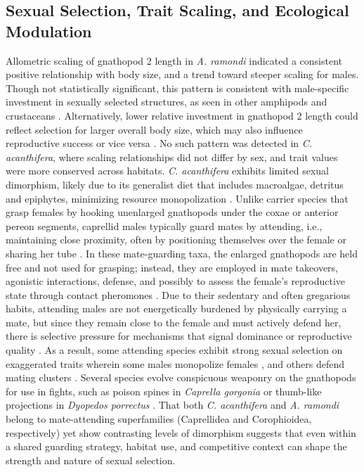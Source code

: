 \documentclass[journal,article,submit,pdftex,moreauthors]{Definitions/mdpi}
\begin{document}
    		\subsection{Sexual Selection, Trait Scaling, and Ecological Modulation}
    		
    		Allometric scaling of gnathopod 2 length in \textit{A. ramondi} indicated a consistent positive relationship with body size, and a trend toward steeper scaling for males. Though not statistically significant, this pattern is consistent with male-specific investment in sexually selected structures, as seen in other amphipods and crustaceans \citep{conlan1991precopulatory}. Alternatively, lower relative investment in gnathopod 2 length could reflect selection for larger overall body size, which may also influence reproductive success \citep{clutton1982functions} or vice versa \citep{Wellborn2000}. No such pattern was detected in \textit{C. acanthifera}, where scaling relationships did not differ by sex, and trait values were more conserved across habitats. \textit{C. acanthifera} exhibits limited sexual dimorphism, likely due to its generalist diet that includes macroalgae, detritus and epiphytes, minimizing resource monopolization  \citep{cruz2000effects}.    		
    		Unlike carrier species that grasp females by hooking unenlarged gnathopods under the coxae or anterior pereon segments, caprellid males typically guard mates by attending, i.e., maintaining close proximity, often by positioning themselves over the female or sharing her tube \citep{conlan1991precopulatory}. In these mate-guarding taxa, the enlarged gnathopods are held free and not used for grasping; instead, they are employed in mate takeovers, agonistic interactions, defense, and possibly to assess the female’s reproductive state through contact pheromones \citep{conlan1991precopulatory}. Due to their sedentary and often gregarious habits, attending males are not energetically burdened by physically carrying a mate, but since they remain close to the female and must actively defend her, there is selective pressure for mechanisms that signal dominance or reproductive quality \citep{conlan1991precopulatory}. As a result, some attending species exhibit strong sexual selection on exaggerated traits wherein some males monopolize females \citep{borowsky1987}, and others defend mating clusters \citep{EmlenOring1977}. Several species evolve conspicuous weaponry on the gnathopods for use in fights, such as poison spines in \textit{Caprella gorgonia} \citep{lewbel1978sexual} or thumb-like projections in \textit{Dyopedos porrectus} \citep{mattson1989aspects}. That both \textit{C. acanthifera} and \textit{A. ramondi} belong to mate-attending superfamilies (Caprellidea and Corophioidea, respectively) yet show contrasting levels of dimorphism suggests that even within a shared guarding strategy, habitat use, and competitive context can shape the strength and nature of sexual selection.
    
\end{document}
